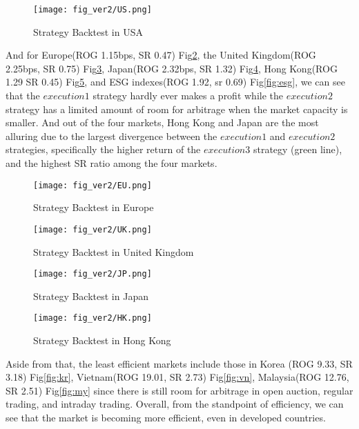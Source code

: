 \begin{figure}[h]
    \centering
    \texttt{[image: fig\_ver2/US.png]}
    \caption{Strategy Backtest in USA}
    \label{fig:us}
\end{figure}


And for Europe(ROG 1.15bps, SR 0.47) Fig\ref{fig:eu}, the United Kingdom(ROG 2.25bps, SR 0.75) Fig\ref{fig:uk}, Japan(ROG 2.32bps, SR 1.32) Fig\ref{fig:jp}, Hong Kong(ROG 1.29 SR 0.45) Fig\ref{fig:hk}, and ESG indexes(ROG 1.92, sr 0.69) Fig\ref{fig:esg}, we can see that the $execution1$ strategy hardly ever makes a profit while the $execution2$ strategy has a limited amount of room for arbitrage when the market capacity is smaller. And out of the four markets, Hong Kong and Japan are the most alluring due to the largest divergence between the $execution1$ and $execution2$ strategies, specifically the higher return of the $execution3$ strategy (green line), and the highest SR ratio among the four markets.

\begin{figure}[h]
    \centering
    \texttt{[image: fig\_ver2/EU.png]}
    \caption{Strategy Backtest in Europe}
    \label{fig:eu}
\end{figure}
\begin{figure}[h]
    \centering
    \texttt{[image: fig\_ver2/UK.png]}
    \caption{Strategy Backtest in United Kingdom}
    \label{fig:uk}
\end{figure}
\begin{figure}[h]
    \centering
    \texttt{[image: fig\_ver2/JP.png]}
    \caption{Strategy Backtest in Japan}
    \label{fig:jp}
\end{figure}
\begin{figure}[h]
    \centering
    \texttt{[image: fig\_ver2/HK.png]}
    \caption{Strategy Backtest in Hong Kong}
    \label{fig:hk}
\end{figure}

Aside from that, the least efficient markets include those in Korea (ROG 9.33, SR 3.18) Fig\ref{fig:kr}, Vietnam(ROG 19.01, SR 2.73) Fig\ref{fig:vn}, Malaysia(ROG 12.76, SR 2.51) Fig\ref{fig:my} since there is still room for arbitrage in open auction, regular trading, and intraday trading. Overall, from the standpoint of efficiency, we can see that the market is becoming more efficient, even in developed countries.

